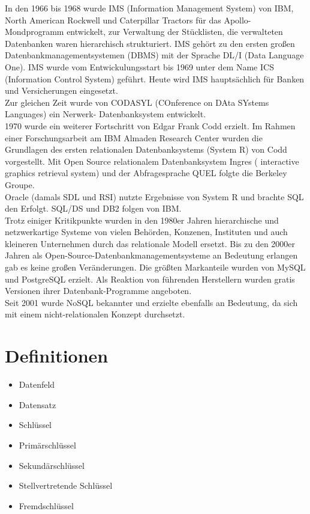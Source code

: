 \documentclass[12pt,a4paper]{report}
\begin{document}
In den 1966 bis 1968 wurde IMS (Information Management System) von IBM, North American Rockwell und Caterpillar Tractors für das Apollo-Mondprogramm entwickelt, zur Verwaltung der Stücklisten, die verwalteten Datenbanken waren hierarchisch strukturiert. IMS gehört zu den ersten großen Datenbankmanagementsystemen (DBMS) mit der Sprache DL/I (Data Language One). IMS wurde vom Entwickulungsstart bis 1969 unter dem Name  ICS (Information Control System) geführt. Heute wird IMS hauptsächlich für Banken und Versicherungen eingesetzt.\\

Zur gleichen Zeit wurde von CODASYL (COnference on DAta SYstems Languages) ein Nerwerk- Datenbanksystem entwickelt.\\

1970 wurde ein weiterer Fortschritt von Edgar Frank Codd erzielt. Im Rahmen einer Forschungsarbeit am IBM Almaden Research Center wurden die Grundlagen des ersten relationalen Datenbanksystems (System R) von Codd vorgestellt. Mit Open Source relationalem Datenbanksystem Ingres ( interactive graphics retrieval system) und der Abfragesprache QUEL folgte die Berkeley Groupe.\\

Oracle (damals SDL und RSI) nutzte Ergebnisse von System R und brachte SQL den Erfolgt. SQL/DS und DB2 folgen von IBM.\\

Trotz einiger Kritikpunkte wurden in den 1980er Jahren hierarchische und netzwerkartige Systeme von vielen Behörden, Konzenen, Instituten und auch kleineren Unternehmen durch das relationale Modell ersetzt. Bis zu den 2000er Jahren als Open-Source-Datenbankmanagementsysteme an Bedeutung erlangen gab es keine großen Veränderungen. Die größten Markanteile wurden von MySQL und PostgreSQL erzielt.
Als Reaktion von führenden Herstellern wurden gratis Versionen ihrer Datenbank-Programme angeboten.\\

Seit 2001 wurde  NoSQL bekannter und erzielte ebenfalls an Bedeutung, da sich mit einem nicht-relationalen Konzept durchsetzt.
\section{Definitionen}
\begin{itemize}
\item Datenfeld
\item Datensatz
\item Schlüssel
\item Primärschlüssel
\item Sekundärschlüssel
\item Stellvertretende Schlüssel
\item Fremdschlüssel

\end{itemize}
\end{document}
